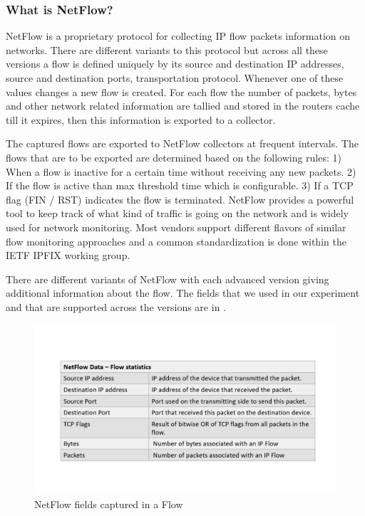 \subsubsection{What is NetFlow?}
NetFlow is a proprietary protocol for collecting IP flow packets information on networks. There are different variants to this protocol but across all these versions a flow is defined uniquely by its source and destination IP addresses, source and destination ports, transportation protocol. Whenever one of these values changes a new flow is created. For each flow the number of packets, bytes and other network related information are tallied and stored in the routers cache till it expires, then this information is exported to a collector. 

The captured flows are exported to NetFlow collectors at frequent intervals. The flows that are to be exported are determined based on the following rules: 1) When a flow is inactive for a certain time without receiving any new packets. 2) If the flow is active than max threshold time which is configurable. 3) If a TCP flag (FIN / RST) indicates the flow is terminated. NetFlow provides a powerful tool to keep track of what kind of traffic is going on the network and is widely used for network monitoring. Most vendors support different flavors of similar flow monitoring approaches and a common standardization is done within the IETF IPFIX working group.

There are different variants of NetFlow with each advanced version giving additional information about the flow. The fields that we used in our experiment and that are supported across the versions are in .

\begin{figure}[t]
	\centerline{
	\includegraphics[trim=2cm 2cm 2cm 2cm, scale = 0.55]{netflow.pdf}}
	\caption{NetFlow fields captured in a Flow }
\end{figure}

